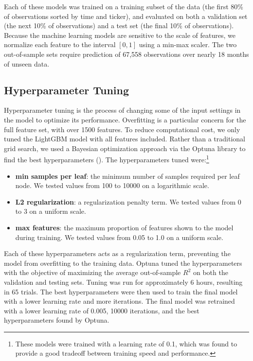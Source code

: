 \documentclass[12pt]{article}
\begin{document}
Each of these models was trained on a training subset of the data (the first 80\% of observations sorted by time and ticker), and evaluated on both a validation set (the next 10\% of observations) and a test set (the final 10\% of observations). Because the machine learning models are sensitive to the scale of features, we normalize each feature to the interval $[0,1]$ using a min-max scaler. The two out-of-sample sets require prediction of 67,558 observations over nearly 18 months of unseen data.

\subsection{Hyperparameter Tuning}
Hyperparameter tuning is the process of changing some of the input settings in the model to optimize its performance. Overfitting is a particular concern for the full feature set, with over 1500 features. To reduce computational cost, we only tuned the LightGBM model with all features included. Rather than a traditional grid search, we used a Bayesian optimization approach via the Optuna library to find the best hyperparameters (\textcite{optuna_2019}). The hyperparameters tuned were:\footnote{These models were trained with a learning rate of 0.1, which was found to provide a good tradeoff between training speed and performance.}
\begin{itemize}
\singlespacing
    \item \textbf{min samples per leaf}: the minimum number of samples required per leaf node. We tested values from 100 to 10000 on a logarithmic scale.
    \item \textbf{L2 regularization}: a regularization penalty term. We tested values from 0 to 3 on a uniform scale.
    \item \textbf{max features}: the maximum proportion of features shown to the model during training. We tested values from 0.05 to 1.0 on a uniform scale.
\end{itemize}
Each of these hyperparameters acts as a regularization term, preventing the model from overfitting to the training data. Optuna tuned the hyperparameters with the objective of maximizing the average out-of-sample $R^2$ on both the validation and testing sets. Tuning was run for approximately 6 hours, resulting in 65 trials. The best hyperparameters were then used to train the final model with a lower learning rate and more iterations. The final model was retrained with a lower learning rate of 0.005, 10000 iterations, and the best hyperparameters found by Optuna.
\end{document}
